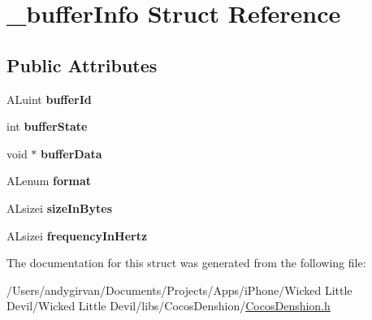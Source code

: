 \hypertarget{struct__buffer_info}{\section{\-\_\-buffer\-Info Struct Reference}
\label{struct__buffer_info}
}
\subsection*{Public Attributes}
\begin{DoxyCompactItemize}
\item 
\hypertarget{struct__buffer_info_ada9a4b0d226243291982b16fd0aa4320}{A\-Luint {\bfseries buffer\-Id}}\label{struct__buffer_info_ada9a4b0d226243291982b16fd0aa4320}

\item 
\hypertarget{struct__buffer_info_a7ec9ded79929d9a8d532e8847cffe18e}{int {\bfseries buffer\-State}}\label{struct__buffer_info_a7ec9ded79929d9a8d532e8847cffe18e}

\item 
\hypertarget{struct__buffer_info_a7d152df8d2289cd3ba5069ab26c5f3a0}{void $\ast$ {\bfseries buffer\-Data}}\label{struct__buffer_info_a7d152df8d2289cd3ba5069ab26c5f3a0}

\item 
\hypertarget{struct__buffer_info_ac74dea7e65809ec13a1d8fa2981bdffe}{A\-Lenum {\bfseries format}}\label{struct__buffer_info_ac74dea7e65809ec13a1d8fa2981bdffe}

\item 
\hypertarget{struct__buffer_info_a0ab48cabebb4e040758bbd751e2eaf1c}{A\-Lsizei {\bfseries size\-In\-Bytes}}\label{struct__buffer_info_a0ab48cabebb4e040758bbd751e2eaf1c}

\item 
\hypertarget{struct__buffer_info_add13810b4e5f1cde5ae260bcc427e9a6}{A\-Lsizei {\bfseries frequency\-In\-Hertz}}\label{struct__buffer_info_add13810b4e5f1cde5ae260bcc427e9a6}

\end{DoxyCompactItemize}


The documentation for this struct was generated from the following file\-:\begin{DoxyCompactItemize}
\item 
/\-Users/andygirvan/\-Documents/\-Projects/\-Apps/i\-Phone/\-Wicked Little Devil/\-Wicked Little Devil/libs/\-Cocos\-Denshion/\hyperlink{_cocos_denshion_8h}{Cocos\-Denshion.\-h}\end{DoxyCompactItemize}

